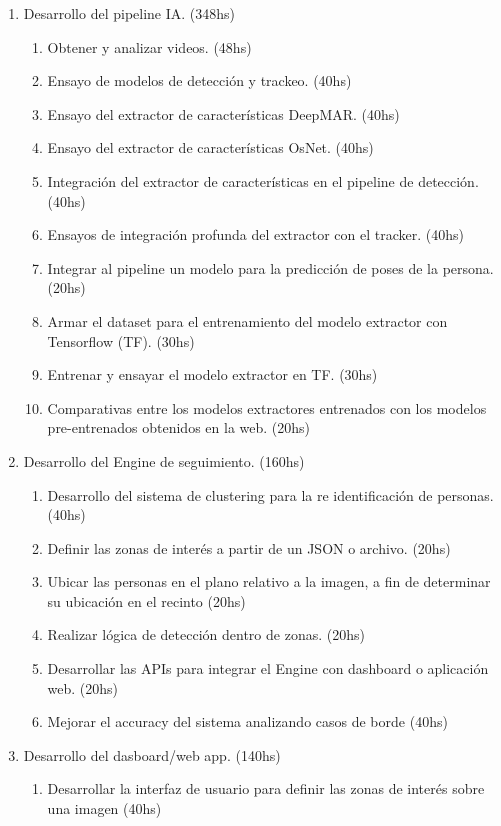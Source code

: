 \documentclass[11pt]{charter}
\begin{document}
\begin{enumerate}
\item Desarrollo del pipeline IA. (348hs)
	\begin{enumerate}
	\item Obtener y analizar videos. (48hs)
	\item Ensayo de modelos de detección y trackeo. (40hs)
	\item Ensayo del extractor de características DeepMAR. (40hs)
	\item Ensayo del extractor de características OsNet. (40hs)
	\item Integración del extractor de características en el pipeline de detección. (40hs)
	\item Ensayos de integración profunda del extractor con el tracker. (40hs)
	\item Integrar al pipeline un modelo para la predicción de poses de la persona. (20hs)
	\item Armar el dataset para el entrenamiento del modelo extractor con Tensorflow (TF). (30hs)
	\item Entrenar y ensayar el modelo extractor en TF. (30hs)
	\item Comparativas entre los modelos extractores entrenados con los modelos pre-entrenados obtenidos en la web. (20hs)	
	\end{enumerate}
\item Desarrollo del Engine de seguimiento. (160hs)
	\begin{enumerate}
	\item Desarrollo del sistema de clustering para la re identificación de personas. (40hs)
	\item Definir las zonas de interés a partir de un JSON o archivo. (20hs)
	\item Ubicar las personas en el plano relativo a la imagen, a fin de determinar su ubicación en el recinto (20hs)
	\item Realizar lógica de detección dentro de zonas. (20hs)
	\item Desarrollar las APIs para integrar el Engine con dashboard o aplicación web. (20hs)
	\item Mejorar el accuracy del sistema analizando casos de borde (40hs)
	\end{enumerate}
\item Desarrollo del dasboard/web app. (140hs)
	\begin{enumerate}
	\item Desarrollar la interfaz de usuario para definir las zonas de interés sobre una imagen (40hs)

\end{enumerate}
\end{enumerate}
\end{document}
